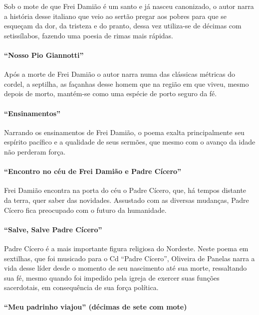 Sob o mote de que Frei Damião é um santo e já nasceu canonizado, o autor
narra a história desse italiano que veio ao sertão pregar aos pobres
para que se esqueçam da dor, da tristeza e do pranto, dessa vez
utiliza-se de décimas com setissílabos, fazendo uma poesia de rimas
mais rápidas.

\paragraph{``Nosso Pio Giannotti''}

Após a morte de Frei Damião o autor narra numa das clássicas métricas do
cordel, a septilha, as façanhas desse homem que na região em que viveu,
mesmo depois de morto, mantém-se como uma espécie de porto seguro da fé.

\paragraph{``Ensinamentos''}

Narrando os ensinamentos de Frei Damião, o poema exalta principalmente
seu espírito pacífico e a qualidade de seus sermões, que mesmo com o
avanço da idade não perderam força.

\paragraph{``Encontro no céu de Frei Damião e Padre Cícero''}

Frei Damião encontra na porta do céu o Padre Cícero,
que, há tempos distante da terra, quer saber das novidades. 
Assustado com as diversas mudanças, Padre Cícero fica preocupado com o futuro da
humanidade.

\paragraph{``Salve, Salve Padre Cícero''}

Padre Cícero é a mais importante figura religiosa do Nordeste. Neste
poema em sextilhas, que foi musicado para o Cd ``Padre
Cícero'', Oliveira de Panelas narra a vida desse líder desde o momento
de seu nascimento até sua morte, ressaltando sua fé, mesmo quando 
foi impedido pela igreja de exercer suas funções sacerdotais, em consequência
de sua força política.

\paragraph{``Meu padrinho viajou'' (décimas de sete com mote)}

